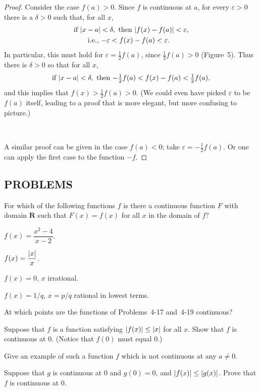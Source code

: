 \begin{proof}
Consider the case $f(a) > 0$. Since $f$ is continuous at $a$, for every
$\varepsilon > 0$ there is a $\delta > 0$ such that, for all $x$,
\begin{align*}
&\text{if } \lvert x - a\rvert < \delta, \text{ then }
  \lvert f(x) - f(a)\rvert < \varepsilon, \\
&\qquad\text{i.e., } {-\varepsilon} < f(x) - f(a) < \varepsilon.
\end{align*}
In particular, this must hold for $\varepsilon = \frac12 f(a)$, since
$\frac12 f(a) > 0$ (Figure~5). Thus there is $\delta > 0$ so that for
all $x$,
\[
\text{if } \lvert x - a\rvert < \delta, \text{ then }
{-\tfrac12 f(a)} < f(x) - f(a) < \tfrac12 f(a),
\]
and this implies that $f(x) > \frac12 f(a) > 0$. (We could even have
picked $\varepsilon$ to be $f(a)$ itself, leading to a proof that is
more elegant, but more confusing to picture.)

\begin{center}
\\[0.6em]
\end{center}

A similar proof can be given in the case $f(a) < 0$; take
$\varepsilon = -\frac12 f(a)$. Or one can apply the first case to the
function $-f$.
\end{proof}

\subsection*{PROBLEMS}

For which of the following functions $f$ is there a continuous function
$F$ with domain $\mathbf{R}$ such that $F(x) = f(x)$ for all $x$ in the
domain of $f$?
\begin{romans}
\item $f(x) = \dfrac{x^2 - 4}{x - 2}$.
\item $f(x) = \dfrac{\lvert x\rvert}{x}$.
\item $f(x) = 0$, $x$ irrational.
\item $f(x) = 1/q$, $x = p/q$ rational in lowest terms.
\end{romans}

At which points are the functions of Problems~4-17 and~4-19 continuous?

\begin{letters}
\item Suppose that $f$ is a function satisfying $\lvert f(x)\rvert \leq \lvert x\rvert$
  for all $x$. Show that $f$ is continuous at $0$. (Notice that $f(0)$
  must equal $0$.)
\item Give an example of such a function $f$ which is not continuous at
  any $a \neq 0$.
\item Suppose that $g$ is continuous at $0$ and $g(0) = 0$, and
  $\lvert f(x)\rvert \leq \lvert g(x)\rvert$. Prove that $f$ is continuous at $0$.
\end{letters}

